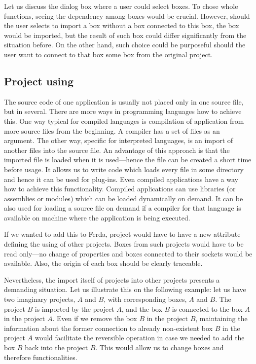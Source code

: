 \documentclass[a4paper,12pt]{book}
\begin{document}
Let us discuss the dialog box where a user could select boxes. To chose whole functions, seeing the dependency among boxes would be crucial. However, should the user selects to import a box without a box connected to this box, the box would be imported, but the result of such box could differ significantly from the situation before. On the other hand, such choice could be purposeful should the user want to connect to that box some box from the original project.

\subsection{Project using}
The source code of one application is usually not placed only in one source file, but in several. There are more ways in programming languages how to achieve this. One way typical for compiled languages is compilation of application from more source files from the beginning. A compiler has a set of files as an argument. The other way, specific for interpreted languages, is an import of another files into the source file. An advantage of this approach is that the imported file is loaded when it is used---hence the file can be created a short time before usage. It allows us to write code which loads every file in some directory and hence it can be used for plug-ins. Even compiled applications have a way how to achieve this functionality. Compiled applications can use libraries (or assemblies or modules) which can be loaded dynamically on demand. It can be also used for loading a source file on demand if a compiler for that language is available on machine where the application is being executed.

If we wanted to add this to Ferda, project would have to have a new attribute defining the using of other projects. Boxes from such projects would have to be read only---no change of properties and boxes connected to their sockets would be available. Also, the origin of each box should be clearly traceable.

Nevertheless, the import itself of projects into other projects presents a demanding situation. Let us illustrate this on the following example: let us have two imaginary projects, $A$ and $B$, with corresponding boxes, $A$ and $B$. The project $B$ is imported by the project $A$, and the box $B$ is connected to the box $A$ in the project $A$. Even if we remove the box $B$ in the project $B$, maintaining the information about the former connection to already non-existent box $B$ in the project $A$ would facilitate the reversible operation in case we needed to add the box $B$ back into the project $B$. This would allow us to change boxes and therefore functionalities.
\end{document}
